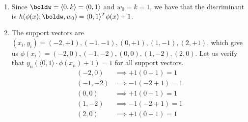 \documentclass[submit]{harvardml}
\begin{document}
\begin{enumerate}
    \item Since $\boldw = \langle 0,k \rangle = \langle 0, 1 \rangle$ and $w_0 = k = 1$, we have that the discriminant is $h(\phi(x) ; \boldw, w_0) = \langle 0, 1 \rangle^T \phi(x) + 1$. 

    \item The support vectors are $(x_i, y_i) = (-2, +1), (-1, -1), (0,+1),(1,-1),(2,+1)$, which give us $\phi(x_i) = (-2, 0), (-1,-2), (0,0), (1,-2), (2,0)$. Let us verify that $y_n ( \langle 0,1 \rangle \cdot \phi(x_n) + 1) = 1$ for all support vectors.
    \begin{align*}
        (-2,0)& \implies +1 (0 + 1) = 1 \\
        (-1,-2)& \implies -1(-2 + 1) = 1 \\
        (0,0)& \implies +1(0 + 1) = 1 \\
        (1,-2)& \implies -1(-2 + 1) = 1 \\
        (2,0)& \implies +1(0 + 1) = 1
    \end{align*}
\end{enumerate}



\end{document}
